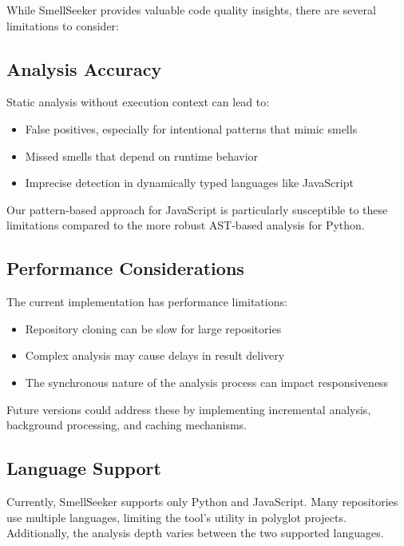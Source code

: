 \documentclass[sigconf,screen]{acmart}
\begin{document}
While SmellSeeker provides valuable code quality insights, there are several limitations to consider:

\subsection{Analysis Accuracy}

Static analysis without execution context can lead to:

\begin{itemize}
    \item False positives, especially for intentional patterns that mimic smells
    \item Missed smells that depend on runtime behavior
    \item Imprecise detection in dynamically typed languages like JavaScript
\end{itemize}

Our pattern-based approach for JavaScript is particularly susceptible to these limitations compared to the more robust AST-based analysis for Python.

\subsection{Performance Considerations}

The current implementation has performance limitations:

\begin{itemize}
    \item Repository cloning can be slow for large repositories
    \item Complex analysis may cause delays in result delivery
    \item The synchronous nature of the analysis process can impact responsiveness
\end{itemize}

Future versions could address these by implementing incremental analysis, background processing, and caching mechanisms.

\subsection{Language Support}

Currently, SmellSeeker supports only Python and JavaScript. Many repositories use multiple languages, limiting the tool's utility in polyglot projects. Additionally, the analysis depth varies between the two supported languages.
\end{document}
